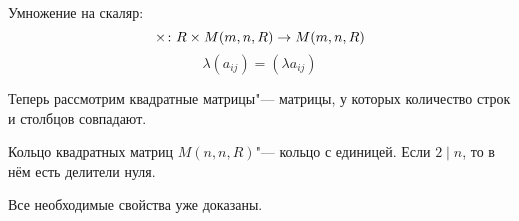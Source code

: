 \begin{Def}
Умножение на скаляр:
$$\times\colon R \times M(m, n, R) \rightarrow M(m, n, R)$$
$$\lambda (a_{ij}) = (\lambda a_{ij})$$
\end{Def}

Теперь рассмотрим квадратные матрицы"--- матрицы, у которых количество строк и столбцов совпадают.

\begin{theorem}{Кольцо квадратных матриц}
$M(n, n, R)$"--- кольцо с единицей. Если $2 \mid n$, то в нём есть делители нуля.
\end{theorem}
Все необходимые свойства уже доказаны.